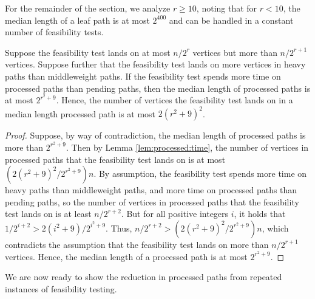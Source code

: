 \noindent
For the remainder of the section, we analyze $r\ge10$, noting that for $r<10$, the median length of a leaf path is at most $2^{400}$ and can be handled in a constant number of feasibility tests.
\begin{lemma}
\label{lem:median:processed}
Suppose the feasibility test lands on at most $n/2^r$ vertices but more than $n/2^{r+1}$ vertices. Suppose further that the feasibility test lands on more vertices in heavy paths than middleweight paths. If the feasibility test spends more time on processed paths than pending paths, then the median length of processed paths is at most $2^{r^2+9}$. Hence, the number of vertices the feasibility test lands on in a median length processed path is at most $2(r^2+9)^2$.
\end{lemma}
\begin{proof}
Suppose, by way of contradiction, the median length of processed paths is more than $2^{r^2+9}$. 
Then by Lemma \ref{lem:processed:time}, the number of vertices in processed paths that the feasibility test lands on is at most $\left(2(r^2+9)^2/2^{r^2+9}\right)n$. 
By assumption, the feasibility test spends more time on heavy paths than middleweight paths, and more time on processed paths than pending paths, so the number of vertices in processed paths that the feasibility test lands on is at least $n/2^{r+2}$. 
But for all positive integers $i$, it holds that $1/2^{i+2}>2(i^2+9)/2^{i^2+9}$. Thus, $n/2^{r+2}>\left(2(r^2+9)^2/2^{r^2+9}\right)n$, which contradicts the assumption that the feasibility test lands on more than $n/2^{r+1}$ vertices. 
Hence, the median length of a processed path is at most $2^{r^2+9}$.
\end{proof}

\noindent
We are now ready to show the reduction in processed paths from repeated instances of feasibility testing.


